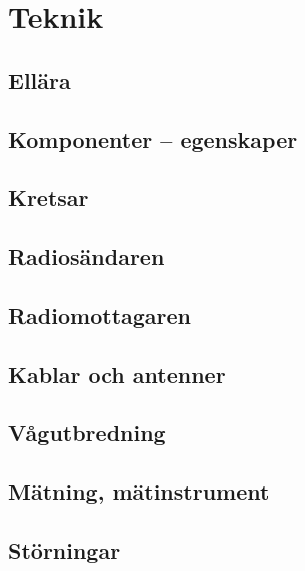 \documentclass[10pt,openany]{report}
\begin{document}
\setlength{\parindent}{0pt}
\setlength{\parskip}{1ex plus 0.5ex minus 0.5ex}



\setcounter{part}{19}
\setcounter{chapter}{0}
\part{Teknik}

\chapter{Ellära}


\chapter{Komponenter -- egenskaper}


\chapter{Kretsar}


\chapter{Radiosändaren}


\chapter{Radiomottagaren}


\chapter{Kablar och antenner}


\chapter{Vågutbredning}


\chapter{Mätning, mätinstrument}


\chapter{Störningar}

\end{document}
